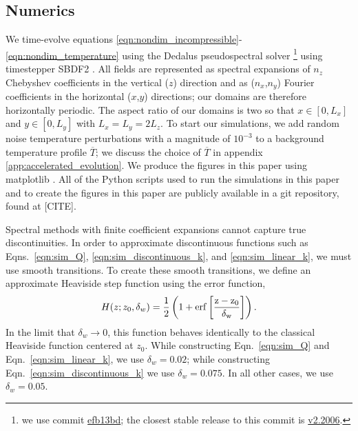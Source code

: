\documentclass{aastex631}
\begin{document}
\subsection{Numerics}
We time-evolve equations \ref{eqn:nondim_incompressible}-\ref{eqn:nondim_temperature} using the Dedalus pseudospectral solver \citep{burns_etal_2020}\footnote{we use commit \href{https://github.com/DedalusProject/dedalus/commit/efb13bdaa09816dde3eee897bc2a15fc284ea2f1}{efb13bd}; the closest stable release to this commit is \href{https://github.com/DedalusProject/dedalus/releases/tag/v2.2006}{v2.2006}.} using timestepper SBDF2 \citep{wang&ruuth2008}.
All fields are represented as spectral expansions of $n_z$ Chebyshev coefficients in the vertical ($z$) direction and as ($n_x$,$n_y$) Fourier coefficients in the horizontal ($x$,$y$) directions; our domains are therefore horizontally periodic.
The aspect ratio of our domains is two so that $x \in [0, L_x]$ and $y \in [0, L_y]$ with $L_x = L_y = 2 L_z$.
To start our simulations, we add random noise temperature perturbations with a magnitude of $10^{-3}$ to a background temperature profile $\overline{T}$; we discuss the choice of $\overline{T}$ in appendix \ref{app:accelerated_evolution}.
We produce the figures in this paper using matplotlib \citep{hunter2007, mpl3.3.4}.
All of the Python scripts used to run the simulations in this paper and to create the figures in this paper are publicly available in a git repository, found at [CITE].

Spectral methods with finite coefficient expansions cannot capture true discontinuities.
In order to approximate discontinuous functions such as Eqns.~\ref{eqn:sim_Q}, \ref{eqn:sim_discontinuous_k}, and \ref{eqn:sim_linear_k}, we must use smooth transitions.
To create these smooth transitions, we define an approximate Heaviside step function using the error function,
\begin{equation}
H(z; z_0, \delta_w) = \frac{1}{2}\left(1 + \rm{erf}\left[\frac{z - z_0}{\delta_w}\right]\right).
\label{eqn:heaviside}
\end{equation}
In the limit that $\delta_w \rightarrow 0$, this function behaves identically to the classical Heaviside function centered at $z_0$.
While constructing Eqn.~\ref{eqn:sim_Q} and Eqn.~\ref{eqn:sim_linear_k}, we use $\delta_w = 0.02$; while constructing Eqn.~\ref{eqn:sim_discontinuous_k} we use $\delta_w = 0.075$.
In all other cases, we use $\delta_w = 0.05$.
\end{document}

